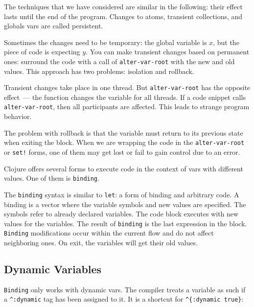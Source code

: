 The techniques that we have considered are similar in the following: their effect lasts until the end of the program.
Changes to atoms, transient collections, and globals vars are called persistent.

Sometimes the changes need to be temporary: the global variable is $x$, but the piece of code is expecting $y$.
You can make transient changes based on permanent ones: surround the code with a call of \verb|alter-var-root| with the new and old values.
This approach has two problems: isolation and rollback.


Transient changes take place in one thread.
But \verb|alter-var-root| has the opposite effect~--- the function changes the variable for all threads.
If a code snippet calls \verb|alter-var-root|, then all participants are affected.
This leads to strange program behavior.

The problem with rollback is that the variable must return to its previous state when exiting the block.
When we are wrapping the code in the \verb|alter-var-root| or \verb|set!| forms, one of them may get lost or fail to gain control due to an error.

Clojure offers several forms to execute code in the context of vars with different values.
One of them is \verb|binding|.


The \verb|binding| syntax is similar to \verb|let|: a form of binding and arbitrary code. A binding is a vector where the variable symbols and new values are specified.
The symbols refer to already declared variables.
The code block executes with new values for the variables.
The result of \verb|binding| is the last expression in the block.
\verb|Binding| modifications occur within the current flow and do not affect neighboring ones.
On exit, the variables will get their old values.

\subsection{Dynamic Variables}

\label{dynamic-vars}


\verb|Binding| only works with dynamic vars.
The compiler treats a variable as such if a \verb|^:dynamic| tag has been assigned to it.
It is a shortcut for \verb|^{:dynamic true}|:

